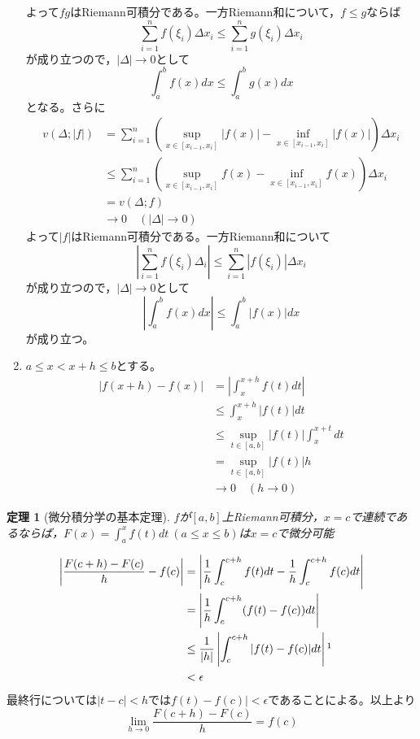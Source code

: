 \documentclass[dvipdfmx,a4j,10pt]{jsarticle}
\makeatletter
\theoremstyle{mystyle1}
\newtheorem{thm}[dfn]{定理}
\theoremstyle{mystyle2}
\renewenvironment{proof}[1][\proofname]{\par
  \pushQED{\qed}%
  \normalfont
  \topsep6\p@\@plus6\p@ \trivlist
  \item[\hskip\labelsep{\bfseries\sffamily #1}]\ignorespaces
}{%
  \popQED\endtrivlist\@endpefalse
}
\renewcommand\proofname{証明}
\makeatother
\begin{document}
\begin{proof}[命題\ref{prop10.4}の証明]
\begin{enumerate}
\[        \]
        よって$fg$はRiemann可積分である。一方Riemann和について，$f\leq g$ならば
        \[
        \sum_{i=1}^n f(\xi_i)\Delta x_i\leq\sum_{i=1}^n g(\xi_i)\Delta x_i
        \]
        が成り立つので，$|\Delta|\to0$として
        \[
        \int_a^b f(x)dx\leq\int_a^b g(x)dx
        \]
        となる。さらに
        \[
        \begin{split}
        v(\Delta;|f|)
        &=\sum_{i=1}^n\left(\sup_{x\in[x_{i-1},x_i]}|f(x)|-\inf_{x\in[x_{i-1},x_i]}|f(x)|\right)\Delta x_i\\
        &\leq\sum_{i=1}^n\left(\sup_{x\in[x_{i-1},x_i]}f(x)-\inf_{x\in[x_{i-1},x_i]}f(x)\right)\Delta x_i\\
        &=v(\Delta;f)\\
        &\to0\quad(|\Delta|\to0)
        \end{split}
        \]
        よって$|f|$はRiemann可積分である。一方Riemann和について
        \[
        \left|\sum_{i=1}^n f(\xi_i)\Delta_i\right|\leq\sum_{i=1}^n|f(\xi_i)|\Delta x_i
        \]
        が成り立つので，$|\Delta|\to0$として
        \[
        \left|\int_a^b f(x)dx\right|\leq\int_a^b|f(x)|dx
        \]
        が成り立つ。
        \item
        $a\leq x<x+h\leq b$とする。
        \[
        \begin{split}
        |f(x+h)-f(x)|
        &=\left|\int_x^{x+h}f(t)dt\right|\\
        &\leq\int_x^{x+h}|f(t)|dt\\
        &\leq\sup_{t\in[a,b]}|f(t)|\int_x^{x+t}dt\\
        &= \sup_{t\in[a,b]}|f(t)|h\\
        &\to 0\quad(h\to0)
        \end{split}
        \]
    \end{enumerate}
\end{proof}

\begin{framed}
    \begin{thm}[微分積分学の基本定理]\label{thm10.5}
    	$f$が$[a,b]$上Riemann可積分，$x=c$で連続であるならば，$\displaystyle F(x)=\int_a^x f(t)dt\ (a\leq x\leq b)$は$x=c$で微分可能
    \end{thm}
\end{framed}

\begin{proof}[定理\ref{thm10.5}の証明]
    \[
    \begin{split}
    \left|\frac{F(c+h)-F(c)}{h}-f(c)\right|
    &=\left|\frac{1}{h}\int_c^{c+h}f(t)dt-\frac{1}{h}\int_c^{c+h}f(c)dt\right|\\
    &=\left|\frac{1}{h}\int_c^{c+h}(f(t)-f(c))dt\right|\\
    &\leq\frac{1}{|h|}\left|\int_c^{c+h}|f(t)-f(c)|dt\right|\footnotemark\\
    &<\epsilon
    \end{split}
    \]
    最終行については$|t-c|<h$では$f(t)-f(c)|<\epsilon$であることによる。以上より
    \[
    \lim_{h\to0}\frac{F(c+h)-F(c)}{h}=f(c)
    \]
\end{proof}
\end{document}
